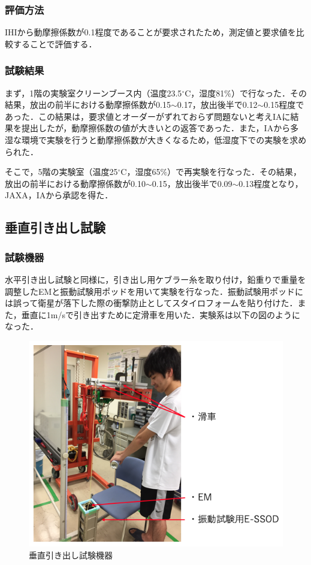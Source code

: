 \subsubsection{評価方法}

IHIから動摩擦係数が0.1程度であることが要求されたため，測定値と要求値を比較することで評価する．

\subsubsection{試験結果}

まず，1階の実験室クリーンブース内（温度23.5$^\circ$C，湿度81$\%$）で行なった．その結果，放出の前半における動摩擦係数が0.15$\sim$0.17，放出後半で0.12$\sim$0.15程度であった．この結果は，要求値とオーダーがずれておらず問題ないと考えIAに結果を提出したが，動摩擦係数の値が大きいとの返答であった．また，IAから多湿な環境で実験を行うと動摩擦係数が大きくなるため，低湿度下での実験を求められた．

そこで，5階の実験室（温度25$^\circ$C，湿度65$\%$）で再実験を行なった．その結果，放出の前半における動摩擦係数が0.10$\sim$0.15，放出後半で0.09$\sim$0.13程度となり，JAXA，IAから承認を得た．

\subsection{垂直引き出し試験}

\subsubsection{試験機器}

水平引き出し試験と同様に，引き出し用ケブラー糸を取り付け，鉛重りで重量を調整したEMと振動試験用ポッドを用いて実験を行なった．振動試験用ポッドには誤って衛星が落下した際の衝撃防止としてスタイロフォームを貼り付けた．また，垂直に1m/sで引き出すために定滑車を用いた．実験系は以下の図のようになった．

\begin{figure}[h]
	\begin{center}
		
		\includegraphics[width=0.6\linewidth]{04/fig/verticalequipment.png}
		\caption{垂直引き出し試験機器}
		\label{fig:verticalequipment}
		
	\end{center}
\end{figure}

